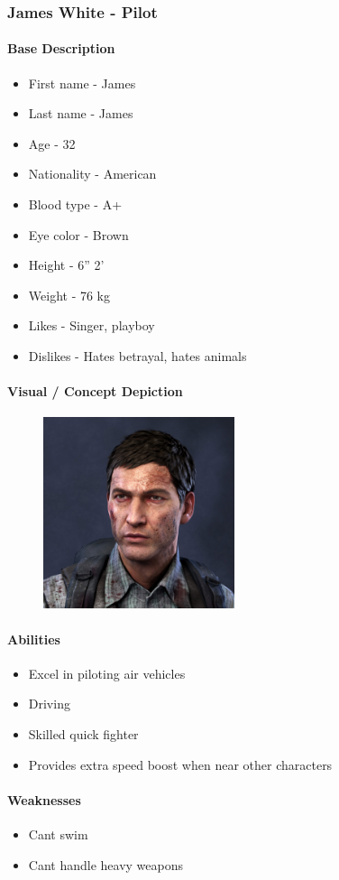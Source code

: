 \subsubsection{James White - Pilot}
	\paragraph{Base Description}\mbox{}
		\begin{itemize}
			\item First name - James
			\item Last name - James
			\item Age - 32
			\item Nationality - American
			\item Blood type - A+
			\item Eye color - Brown
			\item Height - 6” 2’
			\item Weight - 76 kg
			\item Likes - Singer, playboy
			\item Dislikes - Hates betrayal, hates animals
		\end{itemize}
	\paragraph{Visual / Concept Depiction}\mbox{}
		\begin{figure}[H]
			\centering
			\includegraphics[width=0.5\textwidth]{images/characters/james}
		\end{figure}
	\paragraph{Abilities}\mbox{}
		\begin{itemize}
			\item Excel in piloting air vehicles
			\item Driving 
			\item Skilled quick fighter
			\item Provides extra speed boost when near other characters
		\end{itemize}
	\paragraph{Weaknesses}\mbox{}
		\begin{itemize}
			\item Can\textquotesingle t swim
			\item Can\textquotesingle t handle heavy weapons
		\end{itemize}